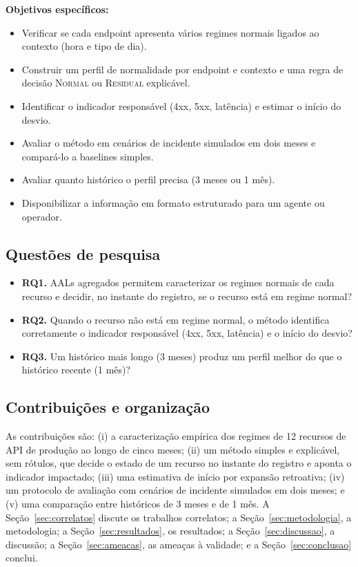 \documentclass[sigconf,nonacm]{acmart}
\newcommand{\Normal}{\textsc{Normal}\xspace}
\newcommand{\Residual}{\textsc{Residual}\xspace}
\begin{document}
\textbf{Objetivos específicos:}
\begin{itemize}
  \item Verificar se cada endpoint apresenta vários regimes normais ligados ao contexto (hora e tipo de dia).
  \item Construir um perfil de normalidade por endpoint e contexto e uma regra de decisão \Normal ou \Residual explicável.
  \item Identificar o indicador responsável (4xx, 5xx, latência) e estimar o início do desvio.
  \item Avaliar o método em cenários de incidente simulados em dois meses e compará-lo a baselines simples.
  \item Avaliar quanto histórico o perfil precisa (3 meses ou 1 mês).
  \item Disponibilizar a informação em formato estruturado para um agente ou operador.
\end{itemize}

\subsection{Questões de pesquisa}
\begin{itemize}
  \item \textbf{RQ1.} AALs agregados permitem caracterizar os regimes normais de cada recurso e decidir, no instante do registro, se o recurso está em regime normal?
  \item \textbf{RQ2.} Quando o recurso não está em regime normal, o método identifica corretamente o indicador responsável (4xx, 5xx, latência) e o início do desvio?
  \item \textbf{RQ3.} Um histórico mais longo (3 meses) produz um perfil melhor do que o histórico recente (1 mês)?
\end{itemize}

\subsection{Contribuições e organização}
As contribuições são: (i) a caracterização empírica dos regimes de 12 recursos de API de produção ao longo de cinco meses; (ii) um método simples e explicável, sem rótulos, que decide o estado de um recurso no instante do registro e aponta o indicador impactado; (iii) uma estimativa de início por expansão retroativa; (iv) um protocolo de avaliação com cenários de incidente simulados em dois meses; e (v) uma comparação entre históricos de 3 meses e de 1 mês. A Seção~\ref{sec:correlatos} discute os trabalhos correlatos; a Seção~\ref{sec:metodologia}, a metodologia; a Seção~\ref{sec:resultados}, os resultados; a Seção~\ref{sec:discussao}, a discussão; a Seção~\ref{sec:ameacas}, as ameaças à validade; e a Seção~\ref{sec:conclusao} conclui.
\end{document}
